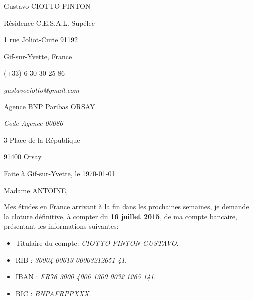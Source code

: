 \documentclass[12pt, a4paper]{article}
\begin{document}
\pagestyle{empty} 

Gustavo CIOTTO PINTON

Résidence C.E.S.A.L. Supélec

1 rue Joliot-Curie 91192 

Gif-sur-Yvette, France

(+33) 6 30 30 25 86	

\textit{gustavociotto@gmail.com}

% 


\begin{flushright}


% 
Agence BNP Paribas ORSAY

\textit{Code Agence 00086}

3 Place de la République

91400 Orsay

\vspace{12pt}


Faite à Gif-sur-Yvette, le \today

\end{flushright}

Madame ANTOINE,

\vspace{12pt}



Mes études en France arrivant à la fin dans les prochaines semaines, je demande
la cloture définitive, à compter du \textbf{16 juillet 2015}, de ma compte
bancaire, présentant les informations suivantes:

\vspace{12pt}

\begin{itemize}
  \item Titulaire du compte: \textit{CIOTTO PINTON GUSTAVO}.
  \item RIB : \textit{30004 00613 00003212651 41}.
  \item IBAN : \textit{FR76 3000 4006 1300 0032 1265 141}.
  \item BIC : \textit{BNPAFRPPXXX}.
\end{itemize}
\end{document}
